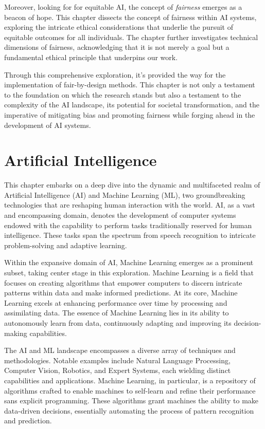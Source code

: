 \documentclass[12pt,a4paper,openright,twoside]{book}
\begin{document}
Moreover, looking for for equitable AI, the concept of \emph{fairness} emerges as a beacon of hope. This chapter dissects the concept of fairness within AI systems, exploring the intricate ethical considerations that underlie the pursuit of equitable outcomes for all individuals. The chapter further investigates technical dimensions of fairness, acknowledging that it is not merely a goal but a fundamental ethical principle that underpins our work. 

Through this comprehensive exploration, it's provided the way for the implementation of fair-by-design methods. This chapter is not only a testament to the foundation on which the research stands but also a testament to the complexity of the AI landscape, its potential for societal transformation, and the imperative of mitigating bias and promoting fairness while forging ahead in the development of AI systems. 


\section{Artificial Intelligence}

This chapter embarks on a deep dive into the dynamic and multifaceted realm of Artificial Intelligence (AI) and Machine Learning (ML), two groundbreaking technologies that are reshaping human interaction with the world. AI, as a vast and encompassing domain, denotes the development of computer systems endowed with the capability to perform tasks traditionally reserved for human intelligence. These tasks span the spectrum from speech recognition to intricate problem-solving and adaptive learning. 

Within the expansive domain of AI, Machine Learning emerges as a prominent subset, taking center stage in this exploration. Machine Learning is a field that focuses on creating algorithms that empower computers to discern intricate patterns within data and make informed predictions. At its core, Machine Learning excels at enhancing performance over time by processing and assimilating data. The essence of Machine Learning lies in its ability to autonomously learn from data, continuously adapting and improving its decision-making capabilities. 

The AI and ML landscape encompasses a diverse array of techniques and methodologies. Notable examples include Natural Language Processing, Computer Vision, Robotics, and Expert Systems, each wielding distinct capabilities and applications. Machine Learning, in particular, is a repository of algorithms crafted to enable machines to self-learn and refine their performance sans explicit programming. These algorithms grant machines the ability to make data-driven decisions, essentially automating the process of pattern recognition and prediction. 
\end{document}
